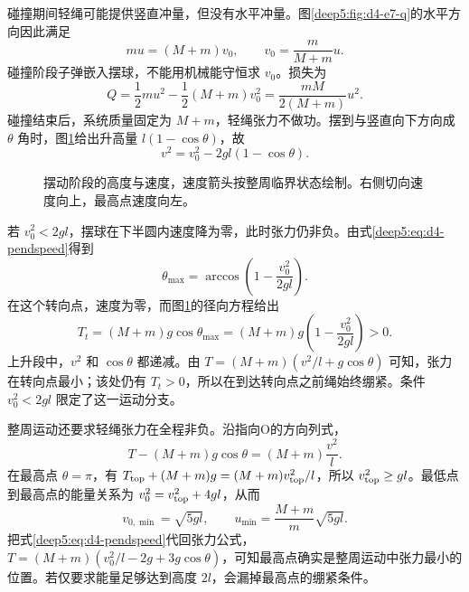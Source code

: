 \begin{solution}
碰撞期间轻绳可能提供竖直冲量，但没有水平冲量。图\ref{deep5:fig:d4-e7-q}的水平方向因此满足
\begin{equation}
 mu=(M+m)v_0,\qquad v_0=\frac m{M+m}u.
\end{equation}
碰撞阶段子弹嵌入摆球，不能用机械能守恒求 $v_0$。损失为
\begin{equation}
 Q=\frac12mu^2-\frac12(M+m)v_0^2
 =\frac{mM}{2(M+m)}u^2.
\end{equation}
碰撞结束后，系统质量固定为 $M+m$，轻绳张力不做功。摆到与竖直向下方向成 $\theta$ 角时，图\ref{deep5:fig:d4-e7-s}给出升高量 $l(1-\cos\theta)$，故
\begin{equation}\label{deep5:eq:d4-pendspeed}
 v^2=v_0^2-2gl(1-\cos\theta).
\end{equation}
\begin{figure}[H]\centering
{}
\caption{摆动阶段的高度与速度，速度箭头按整周临界状态绘制。右侧切向速度向上，最高点速度向左。}\label{deep5:fig:d4-e7-s}
\end{figure}
若 $v_0^2<2gl$，摆球在下半圆内速度降为零，此时张力仍非负。由式\eqref{deep5:eq:d4-pendspeed}得到
\begin{equation}
 \theta_{\max}=\arccos\left(1-\frac{v_0^2}{2gl}\right).
\end{equation}
在这个转向点，速度为零，而图\ref{deep5:fig:d4-e7-s}的径向方程给出
\[
T_t=(M+m)g\cos\theta_{\max}
=(M+m)g\left(1-\frac{v_0^2}{2gl}\right)>0.
\]
上升段中，$v^2$ 和 $\cos\theta$ 都递减。由 $T=(M+m)(v^2/l+g\cos\theta)$ 可知，张力在转向点最小；该处仍有 $T_t>0$，所以在到达转向点之前绳始终绷紧。条件 $v_0^2<2gl$ 限定了这一运动分支。

整周运动还要求轻绳张力在全程非负。沿指向O的方向列式，
\begin{equation}
 T-(M+m)g\cos\theta=(M+m)\frac{v^2}{l}.
\end{equation}
在最高点 $\theta=\pi$，有 $T_{\rm top}+(M+m)g=(M+m)v_{\rm top}^2/l$，所以 $v_{\rm top}^2\ge gl$。最低点到最高点的能量关系为 $v_0^2=v_{\rm top}^2+4gl$，从而
\begin{equation}
 v_{0,\min}=\sqrt{5gl},\qquad
 u_{\min}=\frac{M+m}{m}\sqrt{5gl}.
\end{equation}
把式\eqref{deep5:eq:d4-pendspeed}代回张力公式，$T=(M+m)(v_0^2/l-2g+3g\cos\theta)$，可知最高点确实是整周运动中张力最小的位置。若仅要求能量足够达到高度 $2l$，会漏掉最高点的绷紧条件。
\end{solution}



